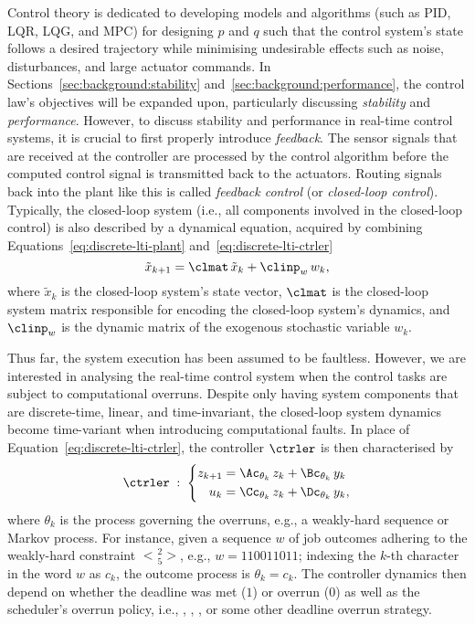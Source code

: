 Control theory is dedicated to developing models and algorithms (such as PID, LQR, LQG, and MPC) for designing $p$ and $q$ such that the control system's state follows a desired trajectory while minimising undesirable effects such as noise, disturbances, and large actuator commands.
In Sections~\ref{sec:background:stability} and~\ref{sec:background:performance}, the control law's objectives will be expanded upon, particularly discussing \emph{stability}  and \emph{performance}.
However, to discuss stability and performance in real-time control systems, it is crucial to first properly introduce \emph{feedback}.
The sensor signals that are received at the controller are processed by the control algorithm before the computed control signal is transmitted back to the actuators.
Routing signals back into the plant like this is called \emph{feedback control} (or \emph{closed-loop control}).
Typically, the closed-loop system (i.e., all components involved in the closed-loop control) is also described by a dynamical equation, acquired by combining Equations~\eqref{eq:discrete-lti-plant} and~\eqref{eq:discrete-lti-ctrler}
%
\begin{equation}%
    \label{eq:clsys}%
    \tilde{x}_{k+1} = \clmat\, \tilde{x}_k + \clinp_w\, w_k,
\end{equation}
%
where $\tilde{x}_k$ is the closed-loop system's state vector, $\clmat$ is the closed-loop system matrix responsible for encoding the closed-loop system's dynamics, and $\clinp_w$ is the dynamic matrix of the exogenous stochastic variable $w_k$.

Thus far, the system execution has been assumed to be faultless.
However, we are interested in analysing the real-time control system when the control tasks are subject to computational overruns.
Despite only having system components that are discrete-time, linear, and time-invariant, the closed-loop system dynamics become time-variant when introducing computational faults.
In place of Equation~\eqref{eq:discrete-lti-ctrler}, the controller $\ctrler$ is then characterised by
%
\begin{equation}%
    \label{eq:tv-ctrler}%
    \ctrler \; : \; \left\{\begin{aligned}
        z_{k+1} &= \Ac_{\theta_k}\,z_k + \Bc_{\theta_k}\,y_k \\
        u_k &= \Cc_{\theta_k}\,z_k + \Dc_{\theta_k}\,y_k, \\
    \end{aligned}\right.
\end{equation}
%
where $\theta_k$ is the process governing the overruns, e.g., a weakly-hard sequence or Markov process.
For instance, given a sequence $w$ of job outcomes adhering to the weakly-hard \tRH{} constraint $\genfrac{<}{>}{0pt}{}{2}{5}$, e.g., $w = 110011011$; indexing the $k$-th character in the word $w$ as $c_k$, the outcome process is $\theta_k = c_k$.
The controller dynamics then depend on whether the deadline was met ($1$) or overrun ($0$) as well as the scheduler's overrun policy, i.e., \tK{}, \tS{}, \tQ{}, or some other deadline overrun strategy.


